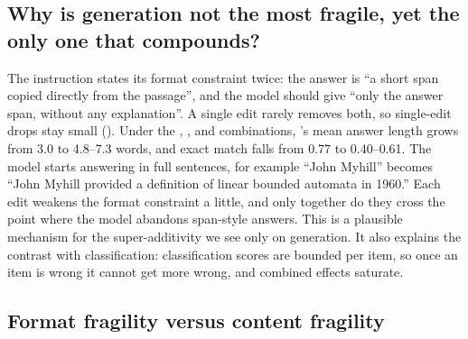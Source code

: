\subsection{Why is generation not the most fragile, yet the only one that compounds?}

The \squad instruction states its format constraint twice: the answer is ``a short span copied directly from the passage'', and the model should give ``only the answer span, without any explanation''. A single edit rarely removes both, so single-edit drops stay small (). Under the , ,  and  combinations, \qwen's mean answer length grows from 3.0 to 4.8--7.3 words, and exact match falls from 0.77 to 0.40--0.61. The model starts answering in full sentences, for example ``John Myhill'' becomes ``John Myhill provided a definition of linear bounded automata in 1960.'' Each edit weakens the format constraint a little, and only together do they cross the point where the model abandons span-style answers. This is a plausible mechanism for the super-additivity we see only on generation. It also explains the contrast with classification: classification scores are bounded per item, so once an item is wrong it cannot get more wrong, and combined effects saturate.

\subsection{Format fragility versus content fragility}
\label{sec:format}

